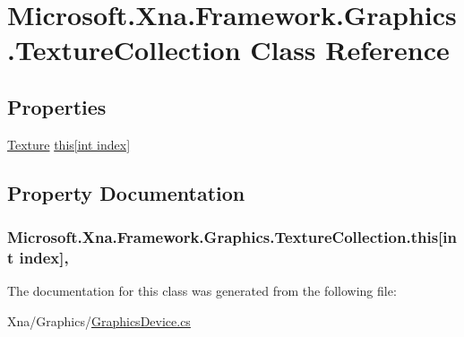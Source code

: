\hypertarget{class_microsoft_1_1_xna_1_1_framework_1_1_graphics_1_1_texture_collection}{}\section{Microsoft.\+Xna.\+Framework.\+Graphics.\+Texture\+Collection Class Reference}
\label{class_microsoft_1_1_xna_1_1_framework_1_1_graphics_1_1_texture_collection}
\subsection*{Properties}
\begin{DoxyCompactItemize}
\item 
\hyperlink{class_microsoft_1_1_xna_1_1_framework_1_1_graphics_1_1_texture}{Texture} \hyperlink{class_microsoft_1_1_xna_1_1_framework_1_1_graphics_1_1_texture_collection_a27cd9eee17de4e52bd087a0f2dd87565}{this\mbox{[}int index\mbox{]}}
\end{DoxyCompactItemize}


\subsection{Property Documentation}
\hypertarget{class_microsoft_1_1_xna_1_1_framework_1_1_graphics_1_1_texture_collection_a27cd9eee17de4e52bd087a0f2dd87565}{}
\subsubsection[{this[int index]}]{ Microsoft.\+Xna.\+Framework.\+Graphics.\+Texture\+Collection.\+this\mbox{[}int index\mbox{]}\hspace{0.3cm}{\ttfamily [get]}, {\ttfamily [set]}}\label{class_microsoft_1_1_xna_1_1_framework_1_1_graphics_1_1_texture_collection_a27cd9eee17de4e52bd087a0f2dd87565}


The documentation for this class was generated from the following file\+:\begin{DoxyCompactItemize}
\item 
Xna/\+Graphics/\hyperlink{_graphics_device_8cs}{Graphics\+Device.\+cs}\end{DoxyCompactItemize}
